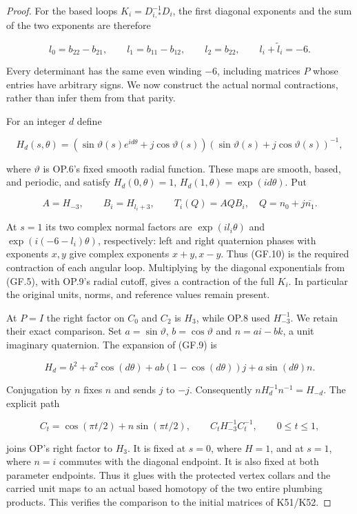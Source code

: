 \begin{proof}
For the based loops \(K_i=D_{i,*}^{-1}D_i\), the first diagonal
exponents and the sum of the two exponents are therefore

\[
 l_0=b_{22}-b_{21},\qquad l_1=b_{11}-b_{12},\qquad
 l_2=b_{22},\qquad l_i+\widetilde l_i=-6.              \tag{GF.8}
\]

Every determinant has the same even winding \(-6\), including matrices
\(P\) whose entries have arbitrary signs. We now construct the actual
normal contractions, rather than infer them from that parity.

For an integer \(d\) define

\[
 H_d(s,\theta)=
 (\sin\vartheta(s)e^{id\theta}+j\cos\vartheta(s))
                    (\sin\vartheta(s)+j\cos\vartheta(s))^{-1},
                                                               \tag{GF.9}
\]

where \(\vartheta\) is OP.6's fixed smooth radial function. These maps
are smooth, based, and periodic, and satisfy \(H_d(0,\theta)=1\),
\(H_d(1,\theta)=\exp(id\theta)\). Put

\[
 A=H_{-3},\qquad B_i=H_{l_i+3},\qquad
                  T_i(Q)=A Q B_i,
 \quad Q=n_0+j\overline{n_1}.                         \tag{GF.10}
\]

At \(s=1\) its two complex normal factors are \(\exp(il_i\theta)\)
and \(\exp(i(-6-l_i)\theta)\), respectively: left and right quaternion
phases with exponents \(x,y\) give complex exponents \(x+y,x-y\).
Thus (GF.10) is the required contraction of each angular loop.
Multiplying by the diagonal exponentials from (GF.5), with OP.9's
radial cutoff, gives a contraction of the full \(K_i\). In particular
the original units, norms, and reference values remain present.

At \(P=I\) the right factor on \(C_0\) and \(C_2\) is \(H_3\), while OP.8 used
\(H_{-3}^{-1}\). We retain their exact comparison. Set \(a=\sin\vartheta\),
\(b=\cos\vartheta\) and \(n=ai-bk\), a unit imaginary quaternion. The
expansion of (GF.9) is

\[
 H_d=b^2+a^2\cos(d\theta)
       +ab(1-\cos(d\theta))j+a\sin(d\theta)n.
\]

Conjugation by \(n\) fixes \(n\) and sends \(j\) to \(-j\). Consequently
\(nH_d^{-1}n^{-1}=H_{-d}\). The explicit path

\[
 C_t=\cos(\pi t/2)+n\sin(\pi t/2),\qquad
 C_tH_{-3}^{-1}C_t^{-1},\qquad 0\leq t\leq1,
                                                               \tag{GF.10a}
\]

joins OP's right factor to \(H_3\). It is fixed at \(s=0\), where \(H=1\),
and at \(s=1\), where \(n=i\) commutes with the diagonal endpoint. It is
also fixed at both parameter endpoints. Thus it glues with the
protected vertex collars and the carried unit maps to an actual
based homotopy of the two entire plumbing products. This verifies
the comparison to the initial matrices of K51/K52.


\end{proof}
